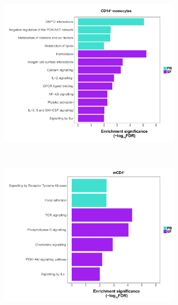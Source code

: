 \begin{figure}[H]
\centering
\begin{subfigure}[b]{0.45\textwidth}
\centering 
\includegraphics[width=\textwidth]{./Results3/pdfs/ATAC_PSA_CD14_pathways_barplot_all_DOCS_proximity}
\caption{}
\end{subfigure}
~
\begin{subfigure}[b]{0.45\textwidth}
\centering 
\includegraphics[width=\textwidth]{./Results3/pdfs/ATAC_PSA_CD4_pathways_barplot_all_DOCS_proximity}
\caption{}
\end{subfigure}
~
\begin{subfigure}[b]{0.45\textwidth} 

\end{subfigure}
\end{figure}

